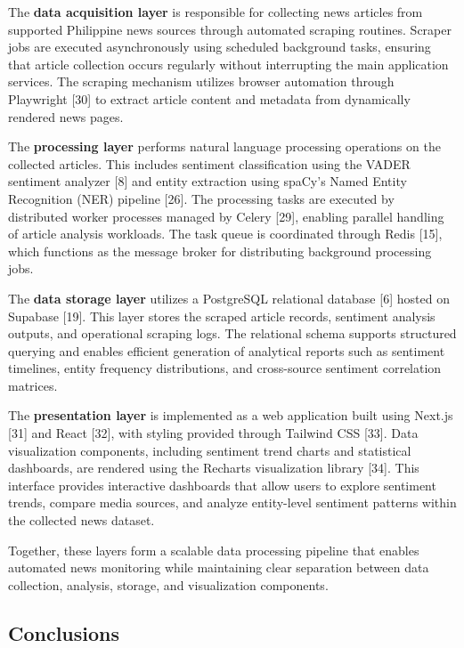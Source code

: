 The \textbf{data acquisition layer} is responsible for collecting news articles from supported Philippine news sources through automated scraping routines. Scraper jobs are executed asynchronously using scheduled background tasks, ensuring that article collection occurs regularly without interrupting the main application services. The scraping mechanism utilizes browser automation through Playwright {[}30{]} to extract article content and metadata from dynamically rendered news pages.

The \textbf{processing layer} performs natural language processing operations on the collected articles. This includes sentiment classification using the VADER sentiment analyzer {[}8{]} and entity extraction using spaCy's Named Entity Recognition (NER) pipeline {[}26{]}. The processing tasks are executed by distributed worker processes managed by Celery {[}29{]}, enabling parallel handling of article analysis workloads. The task queue is coordinated through Redis {[}15{]}, which functions as the message broker for distributing background processing jobs.

The \textbf{data storage layer} utilizes a PostgreSQL relational database {[}6{]} hosted on Supabase {[}19{]}. This layer stores the scraped article records, sentiment analysis outputs, and operational scraping logs. The relational schema supports structured querying and enables efficient generation of analytical reports such as sentiment timelines, entity frequency distributions, and cross-source sentiment correlation matrices.

The \textbf{presentation layer} is implemented as a web application built using Next.js {[}31{]} and React {[}32{]}, with styling provided through Tailwind CSS {[}33{]}. Data visualization components, including sentiment trend charts and statistical dashboards, are rendered using the Recharts visualization library {[}34{]}. This interface provides interactive dashboards that allow users to explore sentiment trends, compare media sources, and analyze entity-level sentiment patterns within the collected news dataset.

Together, these layers form a scalable data processing pipeline that enables automated news monitoring while maintaining clear separation between data collection, analysis, storage, and visualization components.

\subsection{\texorpdfstring{\textbf{Conclusions}}{Conclusions}}\label{conclusions}

